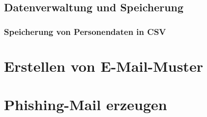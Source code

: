 	\subsection{Datenverwaltung und Speicherung}
	\subsubsection{Speicherung von Personendaten in CSV}
\section{Erstellen von E-Mail-Muster}

\section{Phishing-Mail erzeugen}

